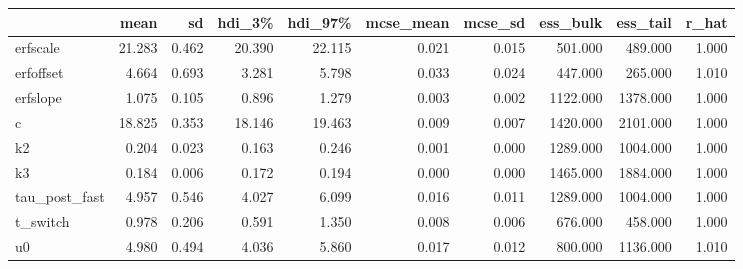 \begin{tabular}{lrrrrrrrrr}
\toprule
 & mean & sd & hdi\_3\% & hdi\_97\% & mcse\_mean & mcse\_sd & ess\_bulk & ess\_tail & r\_hat \\
\midrule
erfscale & 21.283 & 0.462 & 20.390 & 22.115 & 0.021 & 0.015 & 501.000 & 489.000 & 1.000 \\
erfoffset & 4.664 & 0.693 & 3.281 & 5.798 & 0.033 & 0.024 & 447.000 & 265.000 & 1.010 \\
erfslope & 1.075 & 0.105 & 0.896 & 1.279 & 0.003 & 0.002 & 1122.000 & 1378.000 & 1.000 \\
c & 18.825 & 0.353 & 18.146 & 19.463 & 0.009 & 0.007 & 1420.000 & 2101.000 & 1.000 \\
k2 & 0.204 & 0.023 & 0.163 & 0.246 & 0.001 & 0.000 & 1289.000 & 1004.000 & 1.000 \\
k3 & 0.184 & 0.006 & 0.172 & 0.194 & 0.000 & 0.000 & 1465.000 & 1884.000 & 1.000 \\
tau\_post\_fast & 4.957 & 0.546 & 4.027 & 6.099 & 0.016 & 0.011 & 1289.000 & 1004.000 & 1.000 \\
t\_switch & 0.978 & 0.206 & 0.591 & 1.350 & 0.008 & 0.006 & 676.000 & 458.000 & 1.000 \\
u0 & 4.980 & 0.494 & 4.036 & 5.860 & 0.017 & 0.012 & 800.000 & 1136.000 & 1.010 \\
\bottomrule
\end{tabular}
